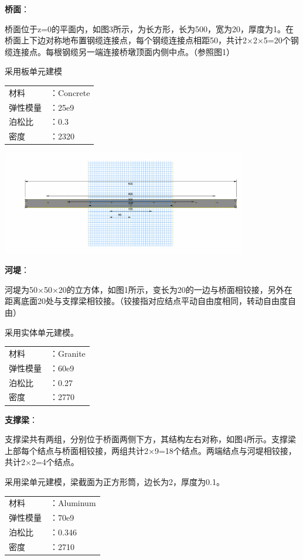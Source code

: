 \documentclass[UTF8]{ctexbook}
\begin{document}
\textbf{桥面}：

桥面位于z=0的平面内，如图3所示，为长方形，长为500，宽为20，厚度为1。在桥面上下边对称地布置钢缆连接点，每个钢缆连接点相距50，共计2×2×5=20个钢缆连接点。每根钢缆另一端连接桥墩顶面内侧中点。（参照图1）

采用板单元建模

\begin{center}
\begin{tabular}{ll}
材料&：Concrete\\
弹性模量&：25e9\\
泊松比&：0.3\\
密度&：2320\\
\end{tabular}
\end{center}

\includegraphics[width=0.8\textwidth]{03.png}

\textbf{河堤}：

河堤为50×50×20的立方体，如图1所示，变长为20的一边与桥面相铰接，另外在距离底面20处与支撑梁相铰接。（铰接指对应结点平动自由度相同，转动自由度自由）

采用实体单元建模。

\begin{center}
\begin{tabular}{ll}
材料&：Granite\\
弹性模量&：60e9\\
泊松比&：0.27\\
密度&：2770\\
\end{tabular}
\end{center}

\textbf{支撑梁}：

支撑梁共有两组，分别位于桥面两侧下方，其结构左右对称，如图4所示。支撑梁上部每个结点与桥面相铰接，两组共计2×9=18个结点。两端结点与河堤相铰接，共计2×2=4个结点。

采用梁单元建模，梁截面为正方形筒，边长为2，厚度为0.1。

\begin{center}
\begin{tabular}{ll}
材料&：Aluminum\\
弹性模量&：70e9\\
泊松比&：0.346\\
密度&：2710\\
\end{tabular}
\end{center}
\end{document}
